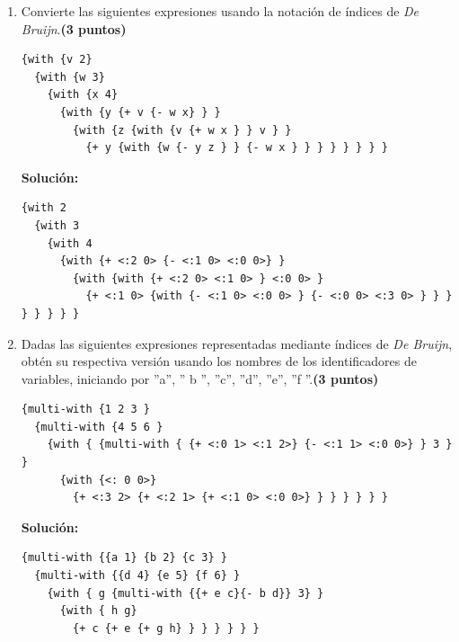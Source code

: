 \documentclass[11pt]{article}
\begin{document}
\begin{enumerate}[leftmargin=0.8cm]
    \item Convierte las siguientes expresiones usando la notación de índices de \textit{De Bruijn}.\textbf{(3 puntos)}
    \begin{lstlisting}
{with {v 2}
  {with {w 3}
    {with {x 4}
      {with {y {+ v {- w x} } }
        {with {z {with {v {+ w x } } v } }
          {+ y {with {w {- y z } } {- w x } } } } } } } }
    \end{lstlisting}

    \textbf{Solución:}

    \begin{lstlisting}
{with 2
  {with 3
    {with 4
      {with {+ <:2 0> {- <:1 0> <:0 0>} }
        {with {with {+ <:2 0> <:1 0> } <:0 0> }
          {+ <:1 0> {with {- <:1 0> <:0 0> } {- <:0 0> <:3 0> } } } } } } } }
    \end{lstlisting}


    \item Dadas las siguientes expresiones representadas mediante índices de \textit{De Bruijn}, obtén su respectiva versión usando los nombres de los identificadores de variables, iniciando por ”a”, ” b ”, ”c”, ”d”, ”e”, ”f ”.\textbf{(3 puntos)}

    \begin{lstlisting}
{multi-with {1 2 3 }
  {multi-with {4 5 6 }
    {with { {multi-with { {+ <:0 1> <:1 2>} {- <:1 1> <:0 0>} } 3 } }
      {with {<: 0 0>}
        {+ <:3 2> {+ <:2 1> {+ <:1 0> <:0 0>} } } } } } }
    \end{lstlisting}

    \textbf{Solución:}

    \begin{lstlisting}
{multi-with {{a 1} {b 2} {c 3} }
  {multi-with {{d 4} {e 5} {f 6} }
    {with { g {multi-with {{+ e c}{- b d}} 3} }
      {with { h g}
        {+ c {+ e {+ g h} } } } } } }
    \end{lstlisting}

\end{enumerate}
\end{document}
